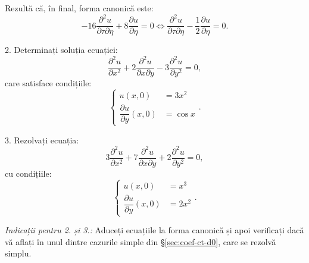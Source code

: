 \newpage

Rezultă că, în final, forma canonică este:
\[
    -16 \dfrac{\partial^2 u}{\partial \tau \partial \eta} + 8 \dfrac{\partial u}{\partial \eta} = 0 %
    \Leftrightarrow \dfrac{\partial^2 u}{\partial \tau \partial \eta} - %
    \dfrac{1}{2} \dfrac{\partial u}{\partial \eta} = 0.
\]

\vspace{0.3cm}

2. Determinați soluția ecuației:
\[
    \dfrac{\partial^2 u}{\partial x^2} + 2 \dfrac{\partial^2 u}{\partial x \partial y} - %
    3 \dfrac{\partial^2 u}{\partial y^2} = 0,
\]
care satisface condițiile:
\[
    \begin{cases}
        u(x, 0) &= 3x^2 \\
        \dfrac{\partial u}{\partial y}(x, 0) &= \cos x
    \end{cases}.
\]

\vspace{0.3cm}

3. Rezolvați ecuația:
\[
    3 \dfrac{\partial^2 u}{\partial x^2} + 7 \dfrac{\partial^2 u}{\partial x\partial y} + %
    2 \dfrac{\partial^2 u}{\partial y^2} = 0,
\]
cu condițiile:
\[
    \begin{cases}
        u(x, 0) &= x^3 \\
        \dfrac{\partial u}{\partial y}(x, 0) &= 2x^2
    \end{cases}.
\]

\textit{Indicații pentru 2. și 3.:} Aduceți ecuațiile la forma canonică și
apoi verificați dacă vă aflați în unul dintre cazurile simple din
\S\ref{sec:coef-ct-d0}, care se rezolvă simplu.

